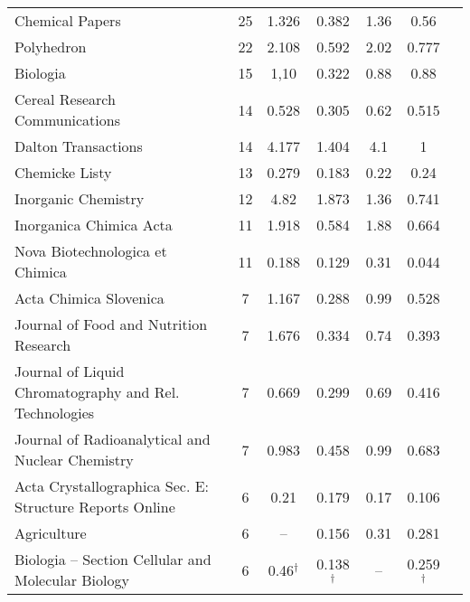 {\begin{longtable}[c]{lcccccc}
  Chemical Papers                                         & 25 & 1.326         & 0.382          & 1.36 & 0.56          \\
  Polyhedron                                              & 22 & 2.108         & 0.592          & 2.02 & 0.777         \\
  Biologia                                                & 15 & 1,10          & 0.322          & 0.88 & 0.88          \\
  Cereal Research Communications                          & 14 & 0.528         & 0.305          & 0.62 & 0.515         \\
  Dalton Transactions                                     & 14 & 4.177         & 1.404          & 4.1  & 1             \\[1ex]
  Chemicke Listy                                          & 13 & 0.279         & 0.183          & 0.22 & 0.24          \\
  Inorganic Chemistry                                     & 12 & 4.82          & 1.873          & 1.36 & 0.741         \\
  Inorganica Chimica Acta                                 & 11 & 1.918         & 0.584          & 1.88 & 0.664         \\
  Nova Biotechnologica et Chimica                         & 11 & 0.188         & 0.129          & 0.31 & 0.044         \\
  Acta Chimica Slovenica                                  & 7  & 1.167         & 0.288          & 0.99 & 0.528         \\[1ex]
  Journal of Food and Nutrition Research                  & 7  & 1.676         & 0.334          & 0.74 & 0.393         \\
  Journal of Liquid Chromatography and Rel. Technologies  & 7  & 0.669         & 0.299          & 0.69 & 0.416         \\
  Journal of Radioanalytical and Nuclear Chemistry        & 7  & 0.983         & 0.458          & 0.99 & 0.683         \\
  Acta Crystallographica Sec. E: Structure Reports Online & 6  & 0.21          & 0.179          & 0.17 & 0.106         \\
  Agriculture                                             & 6  & --            & 0.156          & 0.31 & 0.281         \\[1ex]
  Biologia -- Section Cellular and Molecular Biology      & 6  & 0.46$^\dagger$ & 0.138 $^\dagger$ & --  & 0.259$^\dagger$ \\

\end{longtable}}
